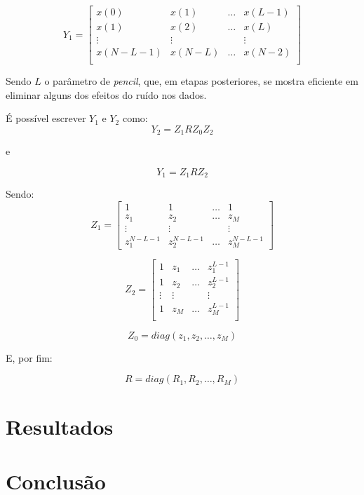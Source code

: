 \documentclass[12pt]{article}
\begin{document}
\begin{equation} \label{eq:3}
    Y_1 = \begin{bmatrix} x(0) & x(1) & \dots & x(L-1) \\
                            x(1) & x(2) & \dots & x(L) \\
                            \vdots & \vdots & & \vdots \\
                            x(N - L - 1) & x(N - L) & \dots & x(N-2) \\
    \end{bmatrix}
\end{equation}

Sendo $L$ o parâmetro de \textit{pencil}, que, em etapas posteriores, se mostra eficiente em eliminar alguns dos efeitos do ruído nos dados.

É possível escrever $Y_1$ e $Y_2$ como:
\begin{equation} 
    Y_2 = Z_1 R Z_0 Z_2
\end{equation}

e

\begin{equation}
    Y_1 = Z_1 R Z_2
\end{equation}

Sendo:
\begin{equation}
    Z_1 = \begin{bmatrix} 1 & 1 & \dots & 1 \\
                            z_1 & z_2 & \dots & z_M \\
                            \vdots & \vdots & & \vdots \\
                            z_1^{N - L - 1} & z_2^{N - L - 1} & \dots & z_M^{N - L - 1} 
    \end{bmatrix}  
\end{equation}

\begin{equation}
    Z_2 = \begin{bmatrix} 1 & z_1 & \dots & z_1^{L-1} \\
                            1 & z_2 & \dots & z_2^{L-1} \\
                            \vdots & \vdots & & \vdots \\
                            1 & z_M & \dots & z_M^{L-1} \\
    \end{bmatrix}
\end{equation}

\begin{equation}
    Z_0 = diag(z_1, z_2, \dots, z_M)
\end{equation}

E, por fim:

\begin{equation}
    R = diag(R_1, R_2, \dots, R_M)
\end{equation}

\section{Resultados}

\section{Conclusão}






\end{document}
